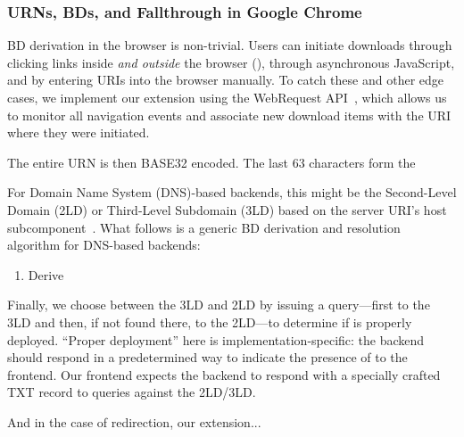 \subsubsection{URNs, BDs, and Fallthrough in Google Chrome}

BD derivation in the browser is non-trivial. Users can initiate downloads
through clicking links inside \emph{and outside} the browser (), through asynchronous JavaScript, and by entering URIs into the
browser manually. To catch these and other edge cases, we implement our
extension using the WebRequest API~\cite{ExtensionAPI}, which allows us to
monitor all navigation events and associate new download items with the URI
where they were initiated.

The entire URN is then BASE32 encoded. The last 63 characters form the 

For Domain Name System (DNS)-based backends, this might be the Second-Level
Domain (2LD) or Third-Level Subdomain (3LD) based on the server URI's host
subcomponent~\cite{RFC3986}. What follows is a generic BD derivation and
resolution algorithm for DNS-based backends:

\begin{enumerate}
    \item Derive 
\end{enumerate}

Finally, we choose between the 3LD and 2LD by issuing a query---first to the 3LD
and then, if not found there, to the 2LD---to determine if \SYSTEM{} is properly
deployed. ``Proper deployment'' here is implementation-specific: the backend
should respond in a predetermined way to indicate the presence of \SYSTEM{} to
the frontend. Our frontend expects the backend to respond with a specially
crafted TXT record to queries against the 2LD/3LD.

And in the case of redirection, our extension...
